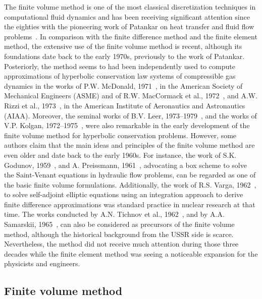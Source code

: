 The finite volume method is one of the most classical discretization techniques in computational fluid dynamics and has been receiving significant attention since the eighties with the pioneering work of Patankar on heat transfer and fluid flow problems~\cite{chap1:1980patankar}.
In comparison with the finite difference method and the finite element method, the extensive use of the finite volume method is recent, although its foundations date back to the early 1970s, previously to the work of Patankar.
Posteriorly, the method seems to had been independently used to compute approximations of hyperbolic conservation law systems of compressible gas dynamics in the works of P.W. McDonald, 1971~\cite{chap1:1971mcdonald}, in the American Society of Mechanical Engineers (ASME) and of R.W. MacCormack et al., 1972~\cite{chap1:1972maccormack}, and A.W. Rizzi et al., 1973~\cite{chap1:1973rizzi}, in the American Institute of Aeronautics and Astronautics (AIAA).
Moreover, the seminal works of B.V. Leer, 1973--1979~\cite{chap1:1973leer,chap1:1974leer,chap1:1976leer,chap1:1977leera,chap1:1977leerb,chap1:1979leer}, and the works of V.P. Kolgan, 1972--1975~\cite{chap1:1972kolgan,chap1:1975kolgana,chap1:1975kolganb}, were also remarkable in the early development of the finite volume method for hyperbolic conservation problems.
However, some authors claim that the main ideas and principles of the finite volume method are even older and date back to the early 1960s.
For instance, the work of S.K. Godunov, 1959~\cite{chap1:1959godunov}, and A. Preissmann, 1961~\cite{chap1:1961preissmann}, advocating a box scheme to solve the Saint-Venant equations in hydraulic flow problems, can be regarded as one of the basic finite volume formulations.
Additionally, the work of R.S. Varga, 1962~\cite{chap1:1962varga}, to solve self-adjoint elliptic equations using an integration approach to derive finite difference approximations was standard practice in nuclear research at that time.
The works conducted by A.N. Tichnov et al., 1962~\cite{chap1:1962tichonov}, and by A.A. Samarskii, 1965~\cite{chap1:1965samarskii}, can also be considered as precursors of the finite volume method, although the historical background from the USSR side is scarce.
Nevertheless, the method did not receive much attention during those three decades while the finite element method was seeing a noticeable expansion for the physicists and engineers.

\subsection{Finite volume method}
\label{chap1:subsec:computational_methods_finite_volume_method}

